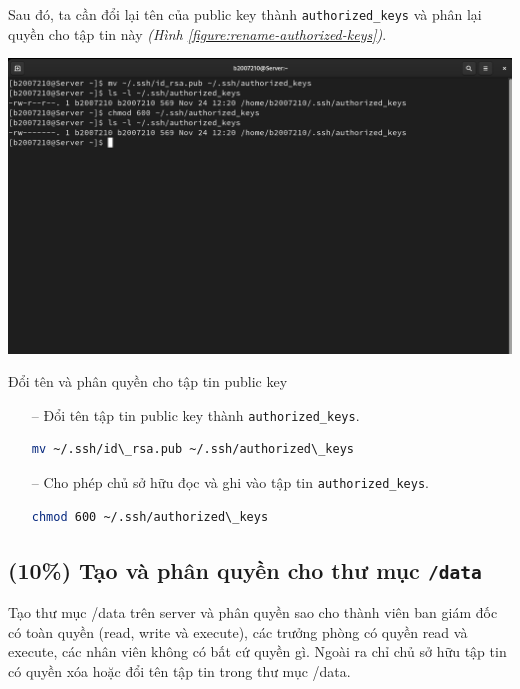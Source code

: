 \documentclass[a4paper, 11pt]{article}
\begin{document}
Sau đó, ta cần đổi lại tên của public key thành \texttt{authorized\_keys} và phân lại quyền cho tập tin này \textit{(Hình \ref{figure:rename-authorized-keys})}. \\
\begin{minipage}
    {\linewidth}
    \captionsetup{type=figure}
    \centering
    \includegraphics[width=\linewidth]{images/rename-authorized-keys.png}
    \caption{Đổi tên và phân quyền cho tập tin public key}
    \label{figure:rename-authorized-keys}
\end{minipage}

\begin{itemize}
    \item[--] Đổi tên tập tin public key thành \texttt{authorized\_keys}.
          \begin{lstlisting}[language=bash, caption=Đổi tên tập tin public key]
mv ~/.ssh/id\_rsa.pub ~/.ssh/authorized\_keys
\end{lstlisting}
    \item[--] Cho phép chủ sở hữu đọc và ghi vào tập tin \texttt{authorized\_keys}.
          \begin{lstlisting}[language=bash, caption=Phân quyền cho tập tin \texttt{authorized\_keys}]
chmod 600 ~/.ssh/authorized\_keys
\end{lstlisting}
\end{itemize}

\subsection{(10\%) Tạo và phân quyền cho thư mục \texttt{/data}}

Tạo thư mục /data trên server và phân quyền sao cho thành viên ban giám đốc có toàn quyền (read, write và execute), các trưởng phòng có quyền read và execute, các nhân viên không có bất cứ quyền gì. Ngoài ra chỉ chủ sở hữu tập tin có quyền xóa hoặc đổi tên tập tin trong thư mục /data.
\end{document}
